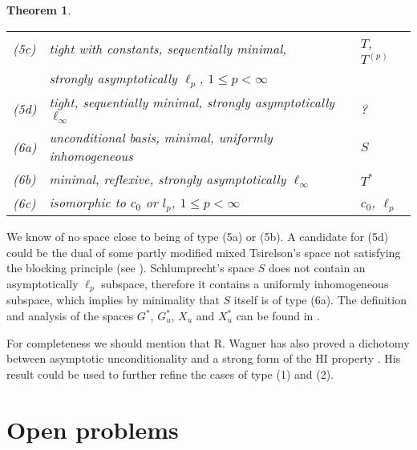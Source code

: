 \documentclass[10pt]{amsart}
\numberwithin{equation}{section}
\newtheorem{thm}{Theorem}[section]
\begin{document}
\begin{thm}
\begin{center}
\begin{tabular}{|l|l|l|}
(5c) & tight with constants, sequentially minimal, & $T$, $T^{(p)}$ \\

     &  strongly asymptotically $\ell_p$, $1 {\ensuremath{\leqslant}} p<\infty$ &   \\

(5d) & tight, sequentially minimal, strongly asymptotically $\ell_{\infty}$ & ?\\

\hline

(6a) & unconditional basis, minimal, uniformly inhomogeneous & $S$ \\

(6b) & minimal, reflexive, strongly asymptotically $\ell_{\infty}$ & $T^*$\\

(6c) & isomorphic to $c_0$ or $l_p$, $1 {\ensuremath{\leqslant}} p<\infty$ & $c_0$, $\ell_p$\\

\hline
  \end{tabular}
\end{center}
\end{thm}

We know of no  space close to being  of type (5a) or (5b). A candidate for (5d)
could be the dual of some partly modified mixed Tsirelson's space not
satisfying the blocking principle (see \cite{KLMT}). Schlumprecht's space $S$
\cite{S1} does not contain an asymptotically $\ell_p$ subspace, therefore it
contains a uniformly inhomogeneous subspace, which implies by minimality that
$S$ itself is of type (6a). The definition and analysis of the spaces $G^*$,
$G^*_u$, $X_u$ and $X^*_u$ can be found in \cite{exemples}.

For completeness we should  mention that R. Wagner has also proved a dichotomy
between asymptotic unconditionality and a strong form of the HI property
\cite{W}. His result could be used to further refine the cases of type (1) and
(2).

\section{Open problems}
\end{document}
